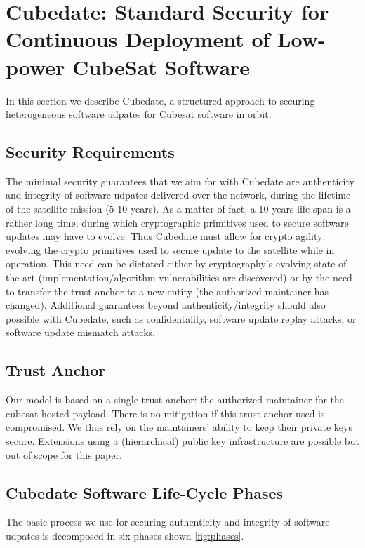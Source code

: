 \section{Cubedate: Standard Security for Continuous Deployment of Low-power CubeSat Software}
\label{sec:low-power-orbital-communication-arch}

In this section we describe Cubedate, a structured approach to securing heterogeneous software udpates for Cubesat software in orbit.

\subsection{Security Requirements}
The minimal security guarantees that we aim for with Cubedate are authenticity and integrity of software udpates delivered over the network, during the lifetime of the satellite mission (5-10 years).
As a matter of fact, a 10 years life span is a rather long time, during which cryptographic primitives used to secure software updates may have to evolve.
Thus Cubedate must allow for crypto agility: evolving the crypto primitives used to secure update to the satellite while in operation. This need can be dictated either by cryptography's evolving state-of-the-art (implementation/algorithm vulnerabilities are discovered) or by the need to transfer the trust anchor to a new entity (the authorized maintainer has changed).
Additional guarantees beyond authenticity/integrity should also possible with Cubedate, such as confidentality, software update replay attacks, or software update mismatch attacks.

\subsection{Trust Anchor}
Our model is based on a single trust anchor: the authorized maintainer for the cubesat hosted payload.
There is no mitigation if this trust anchor used is compromised. 
We thus rely on the maintainers' ability to keep their private keys secure. 
Extensions using a (hierarchical) public key infrastructure are possible but out of scope for this paper.

\subsection{Cubedate Software Life-Cycle Phases}
The basic process we use for securing authenticity and integrity of software udpates is decomposed in six phases shown \autoref{fig:phases}. 

